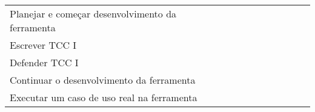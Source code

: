 \begin{table}[!htb]
{\begin{tabular}{p{4cm}|l|lllll|lll}
    Planejar e começar desenvolvimento da ferramenta                                                                                                   &                                      &                                      & {\cellcolor[rgb]{0.753,0.753,0.753}} & {\cellcolor[rgb]{0.753,0.753,0.753}} &                                      &                                      &                                      &                                      &                                      \\
    \rowcolor[rgb]{0.914,0.914,0.914} Escrever TCC I                                                                              &                                      &                                      &                                      & {\cellcolor[rgb]{0.753,0.753,0.753}} & {\cellcolor[rgb]{0.753,0.753,0.753}} & {\cellcolor[rgb]{0.753,0.753,0.753}} &                                      &                                      &                                      \\
    Defender TCC I                                                                                                               &                                      &                                      &                                      &                                      &                                      & {\cellcolor[rgb]{0.753,0.753,0.753}} &                                      &                                      &                                      \\
    \rowcolor[rgb]{0.914,0.914,0.914} Continuar o desenvolvimento da ferramenta                                                            &                                      &                                      &                                      &                                      &                                      & {\cellcolor[rgb]{0.753,0.753,0.753}} & {\cellcolor[rgb]{0.753,0.753,0.753}} & {\cellcolor[rgb]{0.753,0.753,0.753}} &                                      \\
    Executar um caso de uso real na ferramenta                                                                                               &                                      &                                      &                                      &                                      &                                      &                                      &                                      & {\cellcolor[rgb]{0.753,0.753,0.753}} &                                      \\

\end{tabular}}
\end{table}
